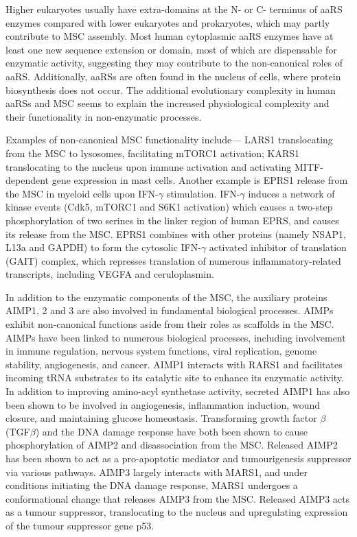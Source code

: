 Higher eukaryotes usually have extra-domains at the N- or C- terminus of aaRS enzymes compared with lower eukaryotes and prokaryotes, which may partly contribute to MSC assembly.
Most human cytoplasmic aaRS enzymes have at least one new sequence extension or domain, most of which are dispensable for enzymatic activity, suggesting they may contribute to the non-canonical roles of aaRS.
Additionally, aaRSs are often found in the nucleus of cells, where protein biosynthesis does not occur.
The additional evolutionary complexity in human aaRSs and MSC seems to explain the increased physiological complexity and their functionality in non-enzymatic processes.

Examples of non-canonical MSC functionality include--- LARS1 translocating from the MSC to lysosomes, facilitating mTORC1 activation\cite{han2012leucyl}; KARS1 translocating to the nucleus upon immune activation and activating MITF-dependent gene expression in mast cells\cite{yannay2009lysrs}.
Another example is EPRS1 release from the MSC in myeloid cells upon IFN-$\gamma$ stimulation\cite{arif2009two}.
IFN-$\gamma$ induces a network of kinase events (Cdk5, mTORC1 and S6K1 activation) which causes a two-step phosphorylation of two serines in the linker region of human EPRS, and causes its release from the MSC.
EPRS1 combines with other proteins (namely NSAP1, L13a and GAPDH) to form the cytosolic IFN-$\gamma$ activated inhibitor of translation (GAIT) complex, which represses translation of numerous inflammatory-related transcripts, including VEGFA and ceruloplasmin\cite{arif2018gait}.


In addition to the enzymatic components of the MSC, the auxiliary proteins AIMP1, 2 and 3 are also involved in fundamental biological processes.
AIMPs exhibit non-canonical functions aside from their roles as scaffolds in the MSC.
AIMPs have been linked to numerous biological processes, including involvement in immune regulation, nervous system functions, viral replication, genome stability, angiogenesis, and cancer.
AIMP1 interacts with RARS1 and facilitates incoming tRNA substrates to its catalytic site to enhance its enzymatic activity\cite{park1999precursor}.
In addition to improving amino-acyl synthetase activity, secreted AIMP1 has also been shown to be involved in angiogenesis, inflammation induction, wound closure, and maintaining glucose homeostasis\cite{park2006hormonal}.
Transforming growth factor $\beta$ (TGF$\beta$) and the DNA damage response have both been shown to cause phosphorylation of AIMP2 and disassociation from the MSC.
Released AIMP2 has been shown to act as a pro-apoptotic mediator and tumourigenesis suppressor via various pathways\cite{zhou2020roles}.
AIMP3 largely interacts with MARS1, and under conditions initiating the DNA damage response, MARS1 undergoes a conformational change that releases AIMP3 from the MSC\cite{kwon2011dual}.
Released AIMP3 acts as a tumour suppressor, translocating to the nucleus and upregulating expression of the tumour suppressor gene p53.

